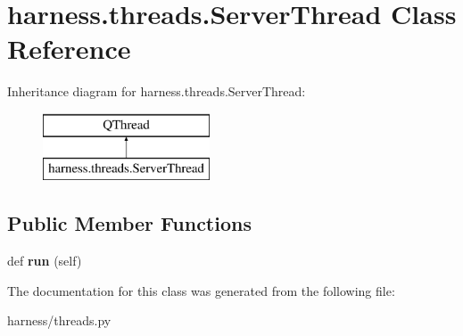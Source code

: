 \hypertarget{classharness_1_1threads_1_1_server_thread}{}\section{harness.\+threads.\+Server\+Thread Class Reference}
\label{classharness_1_1threads_1_1_server_thread}
Inheritance diagram for harness.\+threads.\+Server\+Thread\+:\begin{figure}[H]
\begin{center}
\leavevmode
\includegraphics[height=2.000000cm]{dc/d29/classharness_1_1threads_1_1_server_thread}
\end{center}
\end{figure}
\subsection*{Public Member Functions}
\begin{DoxyCompactItemize}
\item 
\mbox{\label{classharness_1_1threads_1_1_server_thread_a882d23d7a7104bbf85272354ff4b152f}} 
def {\bfseries run} (self)
\end{DoxyCompactItemize}


The documentation for this class was generated from the following file\+:\begin{DoxyCompactItemize}
\item 
harness/threads.\+py\end{DoxyCompactItemize}
